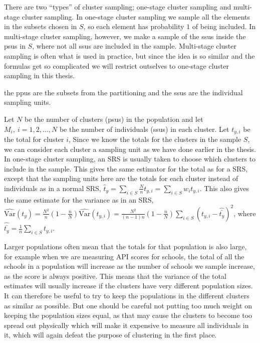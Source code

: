 \documentclass{article}
\begin{document}
There are two ``types'' of cluster sampling; one-stage cluster sampling and
multi-stage cluster sampling. In one-stage cluster sampling we sample all the
elements in the subsets chosen in \(S\), so each element has probability \(1\)
of being included. In multi-stage cluster sampling, however,
we make a sample of the ssus inside the psus in \(S\), where not all ssus are
included in the sample. Multi-stage cluster sampling is often what is used in
practice, but since the idea is so similar and the formulas get so complicated
we will restrict outselves to one-stage cluster sampling in this thesis.

the ppus are the subsets from the
partitioning and the ssus are the individual sampling units.

Let \(N\) be the number of clusters (psus) in the population and let \(M_i,\ i =
1, 2, \dots, N\) be the number of individuals (ssus) in each cluster. Let
\(t_{y, i}\) be the total for cluster \(i\), Since we know the totals for the
clusters in the sample \(S\), we can consider each cluster a sampling unit as we
have done earlier in the thesis. In one-stage cluster sampling, an SRS is
usually taken to choose which clusters to include in the sample. This gives the
same estimator for the total as for a SRS, except that the sampling units here
are the totals for each cluster instead of individuals as in a normal SRS,
\(\hat{t}_y = \sum_{i \in S} \frac{N}{n} t_{y, i} = \sum_{i \in S} w_i t_{y, i} \). 
This also gives the same estimate for the variance as in an SRS,
\(\widehat{\mathrm{Var}}\left(t_{y}\right) = \frac{N^2}{n} \left( 1 - \frac{n}{N}
\right) \hat{\mathrm{Var}}\left( t_{y, i} \right) =
\frac{N^2}{\left( n - 1 \right)n} \left( 1 - \frac{n}{N} \right) \sum_{i \in S}
\left( t_{y, i} - \hat{\bar{t_y}} \right)^2\), where \(\hat{\bar{t_y}} =
\frac{1}{n} \sum_{i \in S} t_{y, i}\).

Larger populations often mean that the totals for that population is also large,
for example when we are measuring API scores for schools, the total of all the
schools in a population will increase as the number of schools we sample
increase, as the score is always positive. This means that the variance of the
total estimates will usually increase if the clusters have very different
population sizes. It can therefore be useful to try to keep the populations in
the different clusters as similar as possible. But one should be careful not
putting too much weight on keeping the population sizes equal, as that may cause
the clusters to become too spread out physically which will make it expensive to
measure all individuals in it, which will again defeat the purpose of clustering
in the first place.
\end{document}
